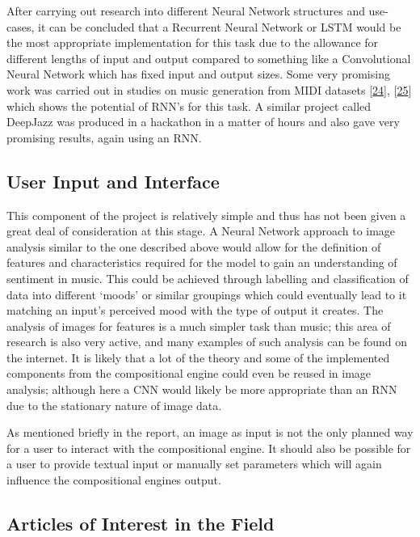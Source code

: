 \documentclass[12pt,]{article}
\begin{document}
After carrying out research into different Neural Network structures and
use-cases, it can be concluded that a Recurrent Neural Network or LSTM
would be the most appropriate implementation for this task due to the
allowance for different lengths of input and output compared to
something like a Convolutional Neural Network which has fixed input and
output sizes. Some very promising work was carried out in studies on
music generation from MIDI datasets
{[}\protect\hyperlink{ref-hilschermusic}{24}{]},
{[}\protect\hyperlink{ref-wyse2018real}{25}{]} which shows the potential
of RNN's for this task. A similar project called DeepJazz was produced
in a hackathon in a matter of hours and also gave very promising
results, again using an RNN.

\hypertarget{user-input-and-interface}{%
\subsection{User Input and Interface}\label{user-input-and-interface}}

This component of the project is relatively simple and thus has not been
given a great deal of consideration at this stage. A Neural Network
approach to image analysis similar to the one described above would
allow for the definition of features and characteristics required for
the model to gain an understanding of sentiment in music. This could be
achieved through labelling and classification of data into different
`moods' or similar groupings which could eventually lead to it matching
an input's perceived mood with the type of output it creates. The
analysis of images for features is a much simpler task than music; this
area of research is also very active, and many examples of such analysis
can be found on the internet. It is likely that a lot of the theory and
some of the implemented components from the compositional engine could
even be reused in image analysis; although here a CNN would likely be
more appropriate than an RNN due to the stationary nature of image data.

As mentioned briefly in the report, an image as input is not the only
planned way for a user to interact with the compositional engine. It
should also be possible for a user to provide textual input or manually
set parameters which will again influence the compositional engines
output.

\hypertarget{articles-of-interest-in-the-field}{%
\subsection{Articles of Interest in the
Field}\label{articles-of-interest-in-the-field}}
\end{document}
